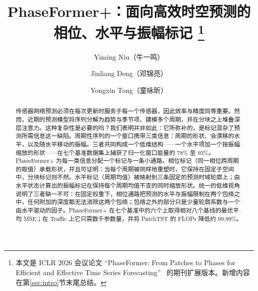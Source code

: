 \documentclass[twocolumn,natbib]{svjour3}
\newcommand{\sysplus}{PhaseFormer+\xspace}
\begin{document}
\title{PhaseFormer+：面向高效时空预测的相位、水平与振幅标记%
\thanks{本文是 ICLR 2026 会议论文 ``PhaseFormer: From Patches to Phases for Efficient and Effective Time Series Forecasting''~\citep{niu2026phaseformer} 的期刊扩展版本。新增内容在第\ref{sec:intro}节末尾总结。}}

\author{Yiming Niu（牛一鸣） \and Jinliang Deng（邓锦亮） \and Yongxin Tong（童咏昕）}



\date{}

\maketitle

\begin{abstract}
传感器网络预测必须在每次更新时服务于每一个传感器，因此效率与精度同等重要。然而，近期的预测模型将序列分解为趋势与季节项、建模多个周期，并在分块之上堆叠深层注意力。这种复杂性是必要的吗？我们表明并非如此：它所弥补的，是标记混杂了预测所需信息这一缺陷。周期性序列的一个窗口携带三类信息：周期的形状、会漂移的水平，以及随水平移动的振幅。三者共同构成一个低维结构——一个水平项加一个按振幅缩放的形状——在七个基准数据集上捕获了归一化窗口能量的 78\% 至 93\%。\sysplus 为每一类信息分配一个标记与一条小通路。相位标记（同一相位跨周期的取值）承载形状，并且可证明：当每个周期被同样地重塑时，它保持在固定子空间中，分块标记则不然。水平标记（周期均值）被映射到三条固定的预测时域轮廓上；由水平状态计算出的振幅标记在保持每个周期均值不变的同时缩放形状。统一的低维视角说明了三者缺一不可：在固定权重下，相位通路把预测的水平与振幅限制在两个包络之中，任何附加的深度都无法消除这两个包络；包络之外的部分只是少量轮廓系数与一个由水平驱动的因子。\sysplus 在七个基准中的六个上取得相对八个基线的最优平均 MSE；在 Traffic 上它只需数千参数量，并将 PatchTST 的 FLOPs 降低约 99.99\%。
\end{abstract}













\appendix

\end{document}
